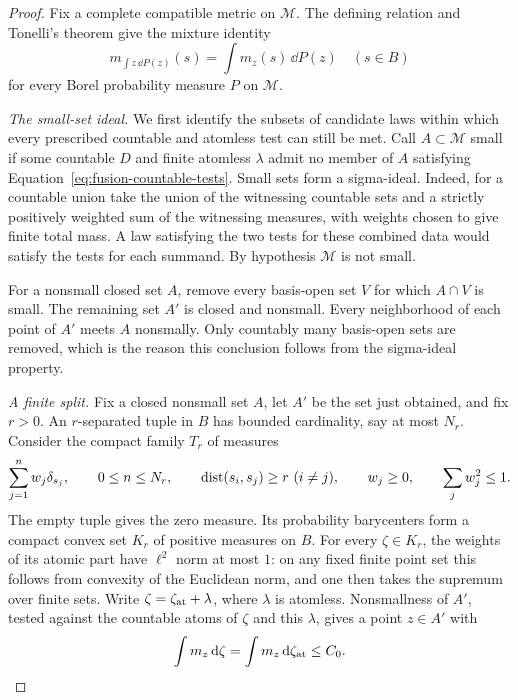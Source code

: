 \begin{proof}
Fix a complete compatible metric on \(\mathcal M\).  The defining
relation and Tonelli's theorem give the mixture identity
\begin{equation}\label{eq:fusion-mixture-identity}
 m_{\int z\,\dd P(z)}(s)=\int m_z(s)\,\dd P(z)
 \quad(s\in B)
\end{equation}
for every Borel probability measure \(P\) on \(\mathcal M\).

\smallskip\noindent
\emph{The small-set ideal.}
We first identify the subsets of candidate laws within which every
prescribed countable and atomless test can still be met.
Call \(A\subset\mathcal M\) small if some countable \(D\) and finite
atomless \(\lambda\) admit no member of \(A\) satisfying
Equation~\eqref{eq:fusion-countable-tests}.  Small sets form a sigma-ideal.
Indeed, for a countable union take the union of the witnessing countable
sets and a strictly positively weighted sum of the witnessing measures,
with weights chosen to give finite total mass.  A law satisfying the two
tests for these combined data would satisfy the tests for each summand.
By hypothesis \(\mathcal M\) is not small.

For a nonsmall closed set \(A\), remove every basis-open set \(V\) for
which \(A\cap V\) is small.  The remaining set \(A'\) is closed and
nonsmall.  Every neighborhood of each point of \(A'\) meets \(A\)
nonsmally.  Only countably many basis-open sets are removed, which is the
reason this conclusion follows from the sigma-ideal property.

\smallskip\noindent
\emph{A finite split.}
Fix a closed nonsmall set $A$, let $A'$ be the set just obtained,
and fix \(r>0\).
An \(r\)-separated tuple in \(B\) has bounded cardinality,
say at most \(N_r\).  Consider the compact family \(T_r\) of measures
\[
 \sum_{j=1}^n w_j\delta_{s_j},
 \qquad 0\le n\le N_r,
 \qquad \operatorname{dist}(s_i,s_j)\ge r\ (i\ne j),
 \qquad w_j\ge0,
 \qquad \sum_jw_j^2\le1.
\]
The empty tuple gives the zero measure.  Its probability barycenters form a
compact convex set \(K_r\) of positive measures on \(B\).  For every
\(\zeta\in K_r\), the weights of its atomic part have \(\ell^2\) norm at
most \(1\): on any fixed finite point set this follows from convexity of
the Euclidean norm, and one then takes the supremum over finite sets.
Write \(\zeta=\zeta_{\rm at}+\lambda\), where \(\lambda\) is atomless.
Nonsmallness of \(A'\), tested against the countable atoms of \(\zeta\)
and this \(\lambda\), gives a point \(z\in A'\) with
\[
 \int m_z\,\mathrm d\zeta
 =\int m_z\,\mathrm d\zeta_{\rm at}\le C_0.
\]


\end{proof}
